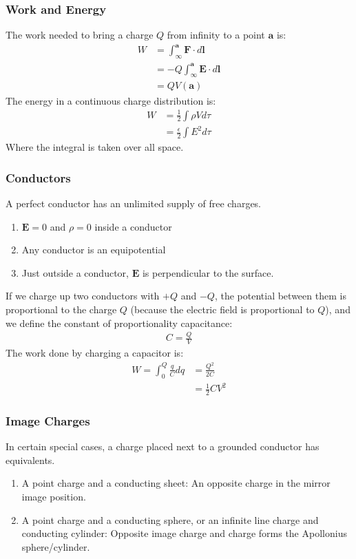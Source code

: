 \documentclass[11pt]{article}
\newcommand{\ve}[1]{
  \ensuremath{\bm{#1}}}	               %
\begin{document}
\begin{multicols*}{3}
\subsubsection{Work and Energy}
The work needed to bring a charge $Q$ from infinity to a point $\ve{a}$ is:
\begin{align*}
W&=\int_{\infty}^{\ve{a}} \ve{F}\cdot d\ve{l}\\
&=-Q\int_{\infty}^{\ve{a}} \ve{E}\cdot d\ve{l}\\
&=QV(\ve{a})
\end{align*}
The energy in a continuous charge distribution is:
\begin{align*}
W&=\frac{1}{2}\int \rho V d\tau\\
&=\frac{\epsilon}{2} \int E^2 d\tau
\end{align*}
Where the integral is taken over all space.
\subsubsection{Conductors}
A perfect conductor has an unlimited supply of free charges. 
\begin{enumerate}
\item $\ve{E}=0$ and $\rho = 0$ inside a conductor
\item Any conductor is an equipotential
\item Just outside a conductor, $\ve{E}$ is perpendicular to the surface.
\end{enumerate}
If we charge up two conductors with $+Q$ and $-Q$, the potential between them is proportional to the charge $Q$ (because the electric field is proportional to $Q$), and we define the constant of proportionality capacitance:
\begin{align*}
C=\frac{Q}{V}
\end{align*}
The work done by charging a capacitor is:
\begin{align*}
W=\int_0^Q \frac{q}{C} dq &= \frac{Q^2}{2C}\\
&=\frac{1}{2}CV^2
\end{align*}
\subsubsection{Image Charges}
In certain special cases, a charge placed next to a grounded conductor has equivalents.
\begin{enumerate}
\item A point charge and a conducting sheet: An opposite charge in the mirror image position.
\item A point charge and a conducting sphere, or an infinite line charge and conducting cylinder: Opposite image charge and charge forms the Apollonius sphere/cylinder.
\end{enumerate}

\end{multicols*}
\end{document}
